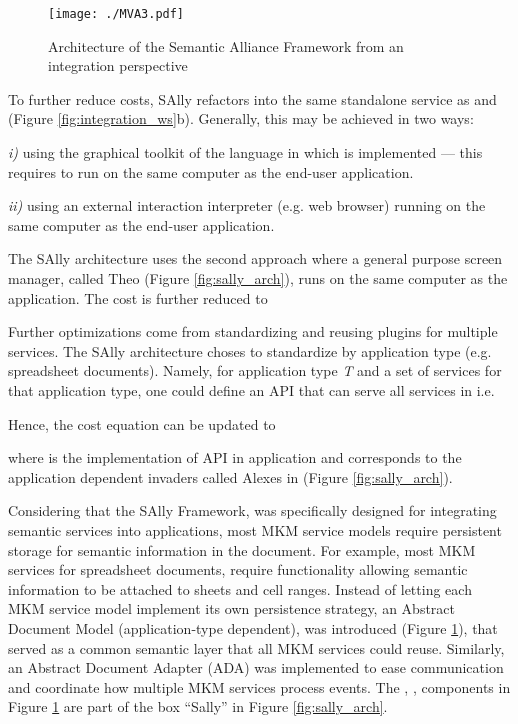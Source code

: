 \documentclass{llncs}
\begin{document}
\begin{figure}
\centering
\texttt{[image: ./MVA3.pdf]}
\caption{Architecture of the Semantic Alliance Framework from an integration perspective}
\label{fig:integration_strategies}
\end{figure}

To further reduce costs, SAlly refactors  into the same standalone service as  and  (Figure \ref{fig:integration_ws}b). Generally, this may be achieved in two ways: \begin{inparaenum}
\item [\textit{i)}] using the graphical toolkit of the language in which  is implemented --- this requires  to run on the same computer as the end-user application. 
\item [\textit{ii)}] using an external interaction interpreter (e.g. web browser) running on the same computer as the end-user application.
\end{inparaenum}
The SAlly architecture uses the second approach where a general purpose screen manager, called Theo (Figure \ref{fig:sally_arch}), runs on the same computer as the application. The cost is further reduced to


Further optimizations come from standardizing and reusing plugins  for multiple services. The SAlly architecture choses to standardize  by application type (e.g. spreadsheet documents). Namely, for application type \textit{T} and a set of services  for that application type, one could define an API  that can serve all services in  i.e. 

Hence, the cost equation can be updated to

where  is the implementation of API  in application  and corresponds to the application dependent invaders called Alexes in \cite{DavJucKoh:safusa12} (Figure \ref{fig:sally_arch}). 

Considering that the SAlly Framework, was specifically designed for integrating semantic services into applications, most MKM service models  require persistent storage for semantic information in the document. For example, most MKM services for spreadsheet documents, require functionality allowing semantic information to be attached to sheets and cell ranges. Instead of letting each MKM service model implement its own persistence strategy, an Abstract Document Model  (application-type dependent), was introduced (Figure \ref{fig:integration_strategies}), that served as a common semantic layer that all MKM services could reuse. Similarly, an Abstract Document Adapter (ADA) was implemented to ease communication and coordinate how multiple MKM services process events. The , ,  components in Figure \ref{fig:integration_strategies} are part of the box ``Sally'' in Figure \ref{fig:sally_arch}.
\end{document}
